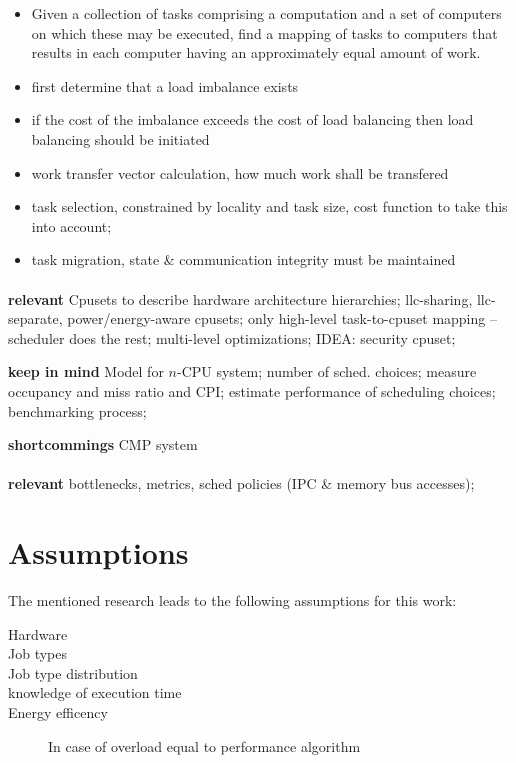 \begin{itemize}
  \item Given a collection of tasks comprising a computation and a set of
computers on which these may be executed, find a mapping of tasks to computers
that results in each computer having an approximately equal amount of work.
  \item first determine that a load imbalance exists
  \item if the cost of the imbalance exceeds the cost of load balancing then
    load balancing should be initiated
  \item work transfer vector calculation, how much work shall be transfered
  \item task selection, constrained by locality and task size, cost function to
    take this into account;
  \item task migration, state \& communication integrity must be maintained
\end{itemize}


\paragraph{ \cite{banikazemi_pam_2008} }
\textbf{relevant} Cpusets to describe hardware architecture hierarchies;
\gls{llc}-sharing, \gls{llc}-separate, power/energy-aware cpusets;
only high-level task-to-cpuset mapping -- scheduler does the rest;
multi-level optimizations;
IDEA: security cpuset;

\textbf{keep in mind} Model for $n$-CPU system;
number of sched. choices;
measure occupancy and miss ratio and CPI;
estimate performance of scheduling choices;
benchmarking process;

\textbf{shortcommings} CMP system


\paragraph{ \cite{zhang_processor_2007} }
\textbf{relevant} bottlenecks, metrics, sched policies (IPC \& memory bus
accesses);


\section{Assumptions}
The mentioned research leads to the following assumptions for this work:


\begin{description}
  \item[Hardware]
  \item[Job types]
  \item[Job type distribution]
  \item[knowledge of execution time]
  \item[Energy efficency] In case of overload equal to performance algorithm

\end{description}


